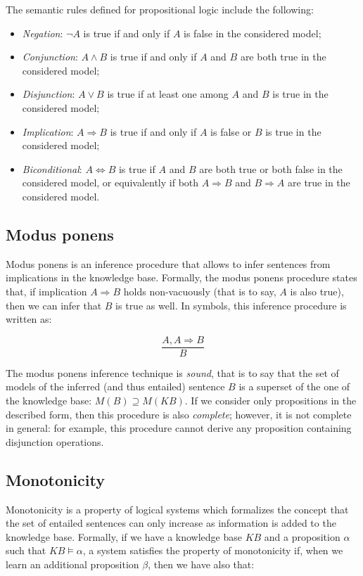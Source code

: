 \documentclass[letterpaper,headings=standardclasses]{scrartcl}
\begin{document}
The semantic rules defined for propositional logic include the following:

\begin{itemize}
    \item \emph{Negation}: $\neg A$ is true if and only if $A$ is false in the considered model;
    \item \emph{Conjunction}: $A \wedge B$ is true if and only if $A$ and $B$ are both true in the considered model;
    \item \emph{Disjunction}: $A \vee B$ is true if at least one among $A$ and $B$ is true in the considered model;
    \item \emph{Implication}: $A \Rightarrow B$ is true if and only if $A$ is false or $B$ is true in the considered model;
    \item \emph{Biconditional}: $A \Leftrightarrow B$ is true if $A$ and $B$ are both true or both false in the considered model, or equivalently if both $A \Rightarrow B$ and $B \Rightarrow A$ are true in the considered model.
\end{itemize}

\subsection{Modus ponens}

Modus ponens is an inference procedure that allows to infer sentences from implications in the knowledge base. Formally, the modus ponens procedure states that, if implication $A \Rightarrow B$ holds non-vacuously (that is to say, $A$ is also true), then we can infer that $B$ is true as well. In symbols, this inference procedure is written as:

$$ \frac{A, A \Rightarrow B}{B} $$

The modus ponens inference technique is \emph{sound}, that is to say that the set of models of the inferred (and thus entailed) sentence $B$ is a superset of the one of the knowledge base: $M(B) \supseteq M(KB)$. If we consider only propositions in the described form, then this procedure is also \emph{complete}; however, it is not complete in general: for example, this procedure cannot derive any proposition containing disjunction operations.

\subsection{Monotonicity}

Monotonicity is a property of logical systems which formalizes the concept that the set of entailed sentences can only increase as information is added to the knowledge base. Formally, if we have a knowledge base $KB$ and a proposition $\alpha$ such that $KB \models \alpha$, a system satisfies the property of monotonicity if, when we learn an additional proposition $\beta$, then we have also that:
\end{document}

